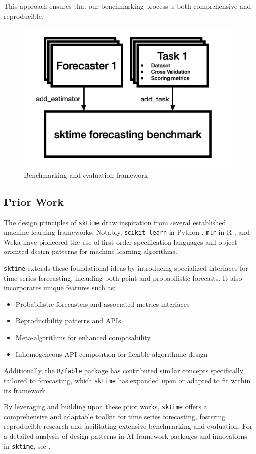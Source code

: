 This approach ensures that our benchmarking process is both comprehensive and reproducible.

\begin{figure}
    \centering
    \includegraphics[width=.5\textwidth]{Figures/evaluationFramework.png}
    \caption{Benchmarking and evaluation framework}
    \label{fig:enter-label}
\end{figure}

\subsection{Prior Work}
The design principles of \texttt{sktime} draw inspiration from several established machine learning frameworks. Notably, \texttt{scikit-learn} in Python \citep{pedregosa2011scikit}, \texttt{mlr} in R \citep{bischl2016mlr}, and Weka \citep{hall2009weka} have pioneered the use of first-order specification languages and object-oriented design patterns for machine learning algorithms.

\texttt{sktime} extends these foundational ideas by introducing specialized interfaces for time series forecasting, including both point and probabilistic forecasts. It also incorporates unique features such as:
\begin{itemize}
    \item Probabilistic forecasters and associated metrics interfaces
    \item Reproducibility patterns and APIs
    \item Meta-algorithms for enhanced composability
    \item Inhomogeneous API composition for flexible algorithmic design
\end{itemize}

Additionally, the \texttt{R/fable} package \citep{hyndman2020package} has contributed similar concepts specifically tailored to forecasting, which \texttt{sktime} has expanded upon or adapted to fit within its framework.

By leveraging and building upon these prior works, \texttt{sktime} offers a comprehensive and adaptable toolkit for time series forecasting, fostering reproducible research and facilitating extensive benchmarking and evaluation.
For a detailed analysis of design patterns in AI framework packages and innovations in \texttt{sktime}, see \citep{kiraly2021designing}.

